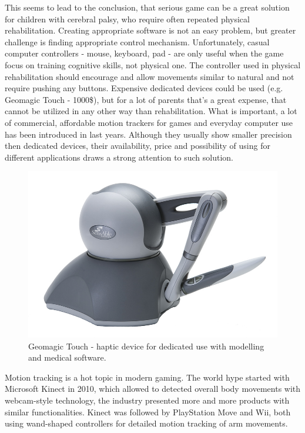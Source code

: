This seems to lead to the conclusion, that serious game can be a great solution for children with cerebral palsy, who require often repeated physical rehabilitation. Creating appropriate software is not an easy problem, but greater challenge is finding appropriate control mechanism. Unfortunately, casual computer controllers - mouse, keyboard, pad - are only useful when the game focus on training cognitive skills, not physical one. The controller used in physical rehabilitation should encourage and allow movements similar to natural and not require pushing any buttons. Expensive dedicated devices could be used (e.g. Geomagic Touch\cite{phantom} - 1000\$), but for a lot of parents that's a great expense, that cannot be utilized in any other way than rehabilitation. What is important, a lot of commercial, affordable motion trackers for games and everyday computer use has been introduced in last years. Although they usually show smaller precision then dedicated devices, their availability, price and possibility of using for different applications draws a strong attention to such solution. 


\begin{figure}
\centering
\includegraphics[width=\textwidth/2]{../images/phantom.jpg} 
\caption{Geomagic Touch - haptic device for dedicated use with modelling and medical software.}
\label{img:phantom}
\end{figure}



Motion tracking is a hot topic in modern gaming. The world hype started with Microsoft Kinect \cite{Kinect} in 2010, which allowed to detected overall body movements with webcam-style technology, the industry presented more and more products with similar functionalities. Kinect was followed by PlayStation Move\cite{psmove} and Wii\cite{wiiu}, both using wand-shaped controllers for detailed motion tracking of arm movements. 

